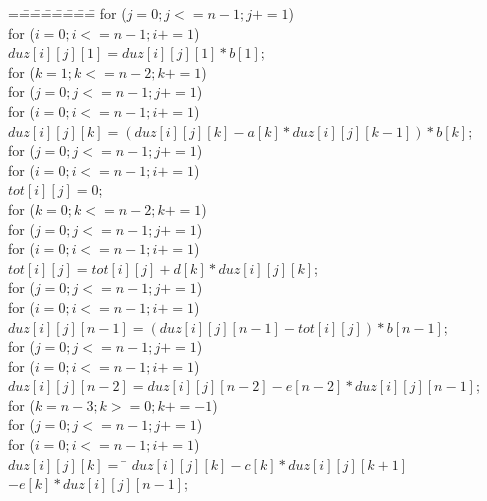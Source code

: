 

\begin {figure*}
\beginfig
{\footnotesize %
\begin {minipage}{.4\textwidth}
\begin {tabbing}
=\==\==\==\==\==\==\==\kill
\>      for ($ j=0; j <=n-1; j+=1$)\\
\>\>     for ($ i=0; i<=n-1; i+=1$)\\
\>\>\>         $duz[i][j][1] = duz[i][j][1]*b[1]$;\\
\>      for ($k=1; k<=n-2; k+=1$)\\
\>\>      for ($j = 0; j <= n-1; j+=1$)\\
\>\>\>      for ($i=0; i<=n-1; i+=1$)\\
\>\>\>\>         $duz[i][j][k]=(duz[i][j][k]-a[k]*duz[i][j][k-1])*b[k]$;\\
\>      for ($ j=0; j <=n-1; j+=1$)\\
\>\>      for ($ i=0; i<=n-1; i+=1$)\\
\>\>         $tot[i][j] = 0$;\\
\>      for ($ k=0; k<=n-2; k+=1$)\\
\>\>      for ($ j=0; j <=n-1; j+=1$)\\
\>\>\>      for ($ i=0; i<=n-1; i+=1$)\\
\>\>\>\>            $tot[i][j] = tot[i][j] + d[k]*duz[i][j][k]$;\\
\>      for ($ j=0; j <=n-1; j+=1$)\\
\>\>      for ($ i=0; i<=n-1; i+=1$)\\
\>\>\>         $duz[i][j][n-1] = (duz[i][j][n-1] - tot[i][j])*b[n-1]$;\\
\>      for ($ j=0; j <=n-1; j+=1$)\\
\>\>      for ($ i=0; i<=n-1; i+=1$)\\
\>\>\>         $duz[i][j][n-2]=duz[i][j][n-2] - e[n-2]*duz[i][j][n-1]$;\\
\>      for ($k=n-3; k>=0; k+=-1$)\\
\>\>      for ($j = 0; j <= n-1; j+=1$)\\
\>\>\>      for ($i=0; i<=n-1; i+=1$)\\
\>\>\>\>       $duz[i][j][k] =$ \= $duz[i][j][k] - c[k]*duz[i][j][k+1]$\\
\>\>\>\>\> $- e[k]*duz[i][j][n-1]$;\\
\end {tabbing}
\end {minipage}
}
\end{figure*}
